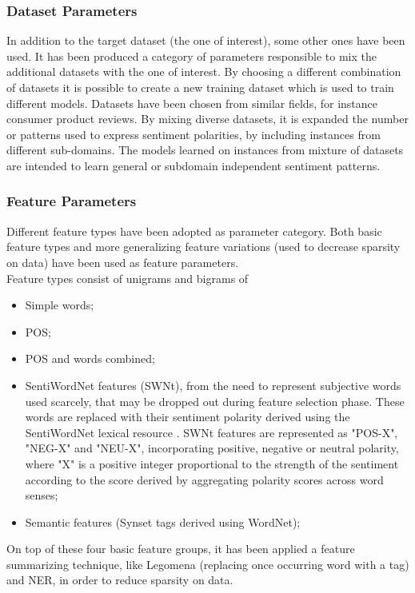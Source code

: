 \subsubsection{Dataset Parameters}

In addition to the target dataset (the one of interest), some other ones have been used. It has been produced a category of parameters responsible to mix the additional datasets with the one of interest. By choosing a different combination of datasets it is possible to create a new training dataset which is used to train different models. Datasets have been chosen from similar fields, for instance consumer product reviews. By mixing diverse datasets, it is expanded the number or patterns used to express sentiment polarities, by including instances from different sub-domains. The models learned on instances from mixture of datasets are intended to learn general or subdomain independent sentiment patterns.

\subsubsection{Feature Parameters}

Different feature types have been adopted as parameter category. Both basic feature types and more generalizing feature variations (used to decrease sparsity on data) have been used as feature parameters.\\
Feature types consist of unigrams and bigrams of
\begin{itemize}
	\item Simple words;
	\item \acl{POS};
	\item \acl{POS} and words combined;
	\item SentiWordNet features (SWNt), from the need to represent subjective words used scarcely, that may be dropped out during feature selection phase. These words are replaced with their sentiment polarity derived using the SentiWordNet lexical resource \cite{Esuli2006sentiwordnet}. SWNt features are represented as "POS-X", "NEG-X" and "NEU-X", incorporating positive, negative or neutral polarity, where "X" is a positive integer proportional to the strength of the sentiment according to the score derived by aggregating polarity scores across word senses;
	\item Semantic features (Synset tags derived using WordNet);
\end{itemize}

On top of these four basic feature groups, it has been applied a feature summarizing technique, like Legomena (replacing once occurring word with a tag) and \ac{NER}, in order to reduce sparsity on data.

